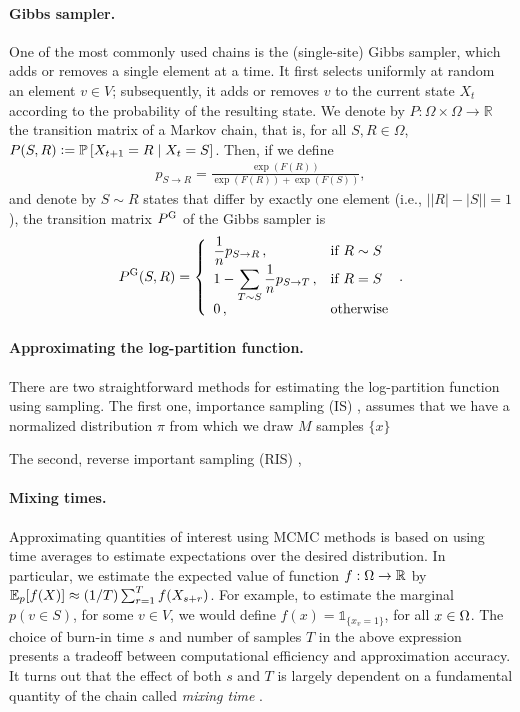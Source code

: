 \paragraph{Gibbs sampler.}
One of the most commonly used chains is the (single-site) Gibbs sampler, which adds or removes a single element %
at a time.
It first selects uniformly at random an element $v \in V$; subsequently, it adds or removes $v$ to the current state $X_t$ according to the probability of the resulting state.
We denote by $P : \Omega \times \Omega \to \mathbb{R}$ the transition matrix of a Markov chain, that is, for all $S, R \in \Omega$, $P(S, R) \defeq \P\left[ X_{t+1} = R \mid X_t = S \right]$.
Then, if we define
\begin{align*}
p_{S \rightarrow R} = \displaystyle\frac{\exp(F(R))}{\exp(F(R)) + \exp(F(S))},
\end{align*}
and denote by $S \sim R$ states that differ by exactly one element (i.e., $\big||R| - |S|\big| = 1$),
the transition matrix $\Pg$ of the Gibbs sampler is
\begin{align*}
  \Pg(S, R) = 
  \threepartdefo{\displaystyle\frac{1}{n}p_{S \rightarrow R}}{R \sim S}{1 - \displaystyle\sum_{T \sim S} \displaystyle\frac{1}{n}p_{S \rightarrow T}}{R = S}{0}.
\end{align*}

\paragraph{Approximating the log-partition function.}
There are two straightforward methods for estimating the log-partition function using sampling.
The first one, importance sampling (IS) \citep{ais}, assumes that we have a normalized distribution $\pi$ from which we draw $M$ samples $\{x\}$

The second, reverse important sampling (RIS) \citep{ris},

\paragraph{Mixing times.}
Approximating quantities of interest using MCMC methods is based on using time averages to estimate expectations over the desired distribution.
In particular, we estimate the expected value of function $f : \ss \to \mathbb{R}$ by $\E_p[f(X)] \approx (1/T)\sum_{r=1}^{T} f(X_{s + r})$.
For example, to estimate the marginal $p(v \in S)$, for some $v \in V$, we would define $f(x) = \mathds{1}_{\{x_v = 1\}}$, for all $x \in \ss$.
The choice of burn-in time $s$ and number of samples $T$ in the above expression presents a tradeoff between computational efficiency and approximation accuracy.
It turns out that the effect of both $s$ and $T$ is largely dependent on a fundamental quantity of the chain called \emph{mixing time} \cite{levin08}.

